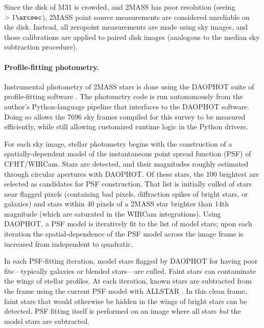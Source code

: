 \documentclass[iop]{emulateapj}
\begin{document}
Since the disk of M31 is crowded, and 2MASS has poor resolution (seeing $> 1\arcsec$), 2MASS point source measurements are considered unreliable on the disk. Instead, all zeropoint measurements are made using sky images, and those calibrations are applied to paired disk images (analogous to the median sky subtraction procedure).

\paragraph{Profile-fitting photometry.} Instrumental photometry of 2MASS stars is done using the DAOPHOT suite of profile-fitting software \citep{Stetson:1987}. The photometry code is run autonomously from the author's Python-language pipeline that interfaces to the DAOPHOT software. Doing so allows the 7696 sky frames compiled for this survey to be measured efficiently, while still allowing customized runtime logic in the Python drivers.

For each sky image, stellar photometry begins with the construction of a spatially-dependent model of the instantaneous point spread function (PSF) of CFHT/WIRCam. Stars are detected, and their magnitudes roughly estimated through circular apertures with DAOPHOT. Of these stars, the 100 brightest are selected as candidates for PSF construction. That list is initially culled of stars near flagged pixels (containing bad pixels, diffraction spikes of bright stars, or galaxies) and stars within 40 pixels of a 2MASS star brighter than 14th magnitude (which are saturated in the WIRCam integrations). Using DAOPHOT, a PSF model is iteratively fit to the list of model stars; upon each iteration the spatial-dependence of the PSF model across the image frame is increased from independent to quadratic.

In each PSF-fitting iteration, model stars flagged by DAOPHOT for having poor fits---typically galaxies or blended stars---are culled. Faint stars can contaminate the wings of stellar profiles. At each iteration, known stars are subtracted from the frame using the current PSF model with ALLSTAR \citep{Stetson:1994}. In this clean frame, faint stars that would otherwise be hidden in the wings of bright stars can be detected. PSF fitting itself is performed on an image where all stars \emph{but} the model stars are subtracted.
\end{document}
